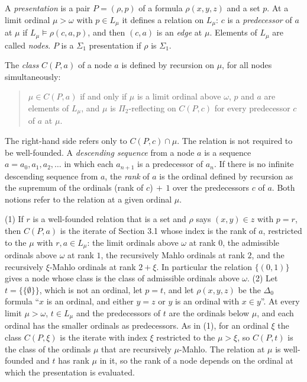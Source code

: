 \documentclass[11pt]{article}
\begin{document}
A \emph{presentation} is a pair $P = (\rho, p)$ of a formula $\rho(x, y, z)$ and a set $p$. At a limit ordinal
$\mu > \omega$ with $p \in L_{\mu}$ it defines a relation on $L_{\mu}$: $c$ is a \emph{predecessor} of $a$ at $\mu$ if
$L_{\mu} \models \rho(c, a, p)$, and then $(c, a)$ is an \emph{edge} at $\mu$. Elements of $L_{\mu}$ are called
\emph{nodes}. $P$ is a $\Sigma_1$ presentation if
$\rho$ is $\Sigma_1$.

\begin{statement} The \emph{class} $C(P, a)$ of a node $a$ is defined by recursion on $\mu$, for
all nodes simultaneously:

\begin{quote}
$\mu \in C(P, a)$ if and only if $\mu$ is a limit ordinal above $\omega$, $p$ and $a$ are elements of $L_{\mu}$, and
$\mu$ is $\Pi_2$-reflecting on $C(P, c)$ for every predecessor $c$ of $a$ at $\mu$.
\end{quote}
\end{statement}

The right-hand side refers only to $C(P, c) \cap \mu$. The relation is not required to be well-founded. A
\emph{descending sequence} from a node $a$ is a sequence $a = a_0, a_1, a_2, \dots$ in which each $a_{n+1}$ is a
predecessor of $a_n$. If there is no infinite descending sequence from $a$, the \emph{rank} of $a$ is the ordinal
defined by recursion as the supremum of the ordinals (rank of $c$)$\,+\,1$ over the predecessors $c$ of $a$. Both
notions refer to the relation at a given ordinal $\mu$.

\begin{statement} (1) If $r$ is a well-founded relation that is a set and $\rho$ says
$(x, y) \in z$ with $p = r$, then $C(P, a)$ is the iterate of Section 3.1 whose index is the rank of $a$,
restricted to the $\mu$ with $r, a \in L_{\mu}$: the limit ordinals above $\omega$ at rank $0$, the admissible
ordinals above $\omega$ at rank $1$, the recursively Mahlo ordinals at rank $2$, and the recursively $\xi$-Mahlo
ordinals at rank $2+\xi$. In
particular the relation $\{(0, 1)\}$ gives a node whose class is the class of admissible ordinals above $\omega$. (2)
Let $t = \{\{\emptyset\}\}$, which is not an ordinal, let $p = t$, and let $\rho(x, y, z)$ be the $\Delta_0$ formula
``$x$ is an ordinal, and either $y = z$ or $y$ is an ordinal with $x \in y$''. At every limit $\mu > \omega$, $t \in
L_{\mu}$ and the predecessors of $t$
are the ordinals below $\mu$, and each ordinal has the smaller ordinals as predecessors. As in (1), for an ordinal
$\xi$ the class $C(P, \xi)$ is the iterate with index $\xi$ restricted to the $\mu > \xi$, so $C(P, t)$ is the
class of the ordinals $\mu$ that are recursively $\mu$-Mahlo. The relation at $\mu$ is well-founded and $t$ has rank $\mu$ in it, so the rank of a node depends
on the ordinal at which the presentation is evaluated.
\end{statement}
\end{document}
